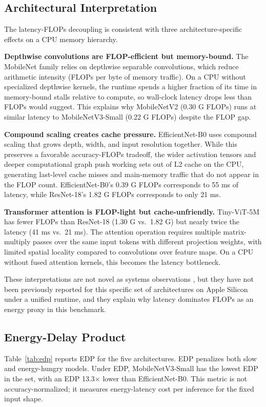 \documentclass{svproc}
\begin{document}
\subsection{Architectural Interpretation}
The latency-FLOPs decoupling is consistent with three architecture-specific
effects on a CPU memory hierarchy.

\textbf{Depthwise convolutions are FLOP-efficient but memory-bound.} The
MobileNet family relies on depthwise separable convolutions, which reduce
arithmetic intensity (FLOPs per byte of memory traffic). On a CPU without
specialized depthwise kernels, the runtime spends a higher fraction of its
time in memory-bound stalls relative to compute, so wall-clock latency drops
less than FLOPs would suggest. This explains why MobileNetV2 (0.30 G FLOPs)
runs at similar latency to MobileNetV3-Small (0.22 G FLOPs) despite the FLOP
gap.

\textbf{Compound scaling creates cache pressure.} EfficientNet-B0 uses
compound scaling that grows depth, width, and input resolution together. While
this preserves a favorable accuracy-FLOPs tradeoff, the wider activation
tensors and deeper computational graph push working sets out of L2 cache on
the CPU, generating last-level cache misses and main-memory traffic that do
not appear in the FLOP count. EfficientNet-B0's 0.39 G FLOPs corresponds to
55 ms of latency, while ResNet-18's 1.82 G FLOPs corresponds to only 21 ms.

\textbf{Transformer attention is FLOP-light but cache-unfriendly.} Tiny-ViT-5M
has fewer FLOPs than ResNet-18 (1.30 G vs.\ 1.82 G) but nearly twice the
latency (41 ms vs.\ 21 ms). The attention operation requires multiple
matrix-multiply passes over the same input tokens with different projection
weights, with limited spatial locality compared to convolutions over feature
maps. On a CPU without fused attention kernels, this becomes the latency
bottleneck.

These interpretations are not novel as systems observations
\cite{eyeriss2017,hardwareaware2019}, but they have not been previously
reported for this specific set of architectures on Apple Silicon under a
unified runtime, and they explain why latency dominates FLOPs as an energy
proxy in this benchmark.

\subsection{Energy-Delay Product}
Table~\ref{tab:edp} reports EDP for the five architectures. EDP penalizes
both slow and energy-hungry models. Under EDP, MobileNetV3-Small has the
lowest EDP in the set, with an EDP 13.3$\times$ lower than
EfficientNet-B0. This metric is not accuracy-normalized; it measures
energy-latency cost per inference for the fixed input shape.
\end{document}

